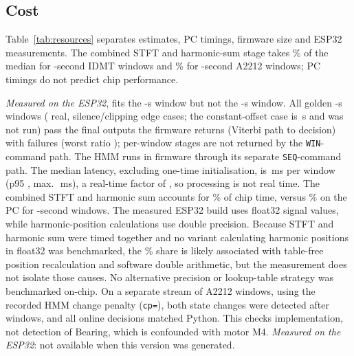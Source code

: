\documentclass[conference]{IEEEtran}
\newif\ifwip
\begin{document}
\begin{table}[t]
\centering
\scriptsize
\caption{Stage checks passed on the PC (\VEqCases{} windows; \VEqSeqCombos{} sequence
configurations). A stage fails if it fails on any window. All
float32 failures are the \VEqFloatBadCases{} synthetic constant-offset edge windows, where the
modulation peak is at the float32 noise floor; the decision is unchanged.}
\label{tab:equiv}

\end{table}

\subsection{Cost}
\label{sec:cost}

\ifwip
\emph{Measured on the PC}, the C float32 reference layout needs \VPcCIdmtMed{} and
\VPcCBldcMed{}\,ms per \VParSegIdmt{}- and \VParSegBldc{}-s window (Python: \VPcPyIdmtMed{} and
\VPcPyBldcMed{}\,ms); none of this transfers to the chip.
\else
Table~\ref{tab:resources} separates estimates, PC timings, firmware size and ESP32 measurements.
The combined STFT and harmonic-sum stage takes \VPcCIdmtTrackPct{}\% of the median for
\VParSegIdmt{}-second IDMT windows and \VPcCBldcTrackPct{}\% for
\VParSegBldc{}-second A2212 windows; PC timings do not predict chip
performance.
\fi

\ifchipmedido
\emph{Measured on the ESP32}, \texttt{\VChipVariant} fits the \VParSegBldc{}-s window but not the
\VParSegIdmt{}-s window. All \VChipEqCases{} golden
\VParSegBldc{}-s windows (\VChipEqCasesReal{} real, \VChipEqCasesEdge{} silence/clipping edge
cases; the constant-offset case is \VParSegIdmt{}\,s and was not run) pass the
\VChipEqStages{} final outputs the firmware returns (Viterbi path to decision) with
\VChipEqFail{} failures (worst ratio \VChipEqMaxRatio{});
\VChipEqStagesAbsent{} per-window stages are not
returned by the \texttt{WIN}-command path. The HMM runs in firmware through its separate
\texttt{SEQ}-command path. The median latency, excluding one-time initialisation, is
\VChipLatBldcMed{}\,ms per window (p95
\VChipLatBldcPninetyfive{}, max.\ \VChipLatBldcMax{}\,ms), a real-time factor of
\VChipRtfBldc{}, so processing is not real time. The combined STFT and harmonic sum accounts for
\VChipBldcTrackPct{}\% of chip time, versus \VPcCBldcTrackPct{}\% on the PC for
\VParSegBldc{}-second windows.
The measured ESP32 build uses float32 signal values, while harmonic-position calculations use
double precision. Because STFT and harmonic sum were timed together and no variant calculating
harmonic positions in float32 was benchmarked, the \VChipBldcTrackPct{}\% share is likely
associated with table-free position recalculation and software double arithmetic, but the
measurement does not isolate those causes. No alternative precision or lookup-table strategy was
benchmarked on-chip. On a separate stream of \VChipSeqWindows{} A2212 windows, using the
recorded HMM change penalty (\texttt{cp=\VChipSeqCp}), both state changes were detected after
\VChipSeqDelay{} windows, and all \VChipSeqSame{} online decisions matched Python. This checks
implementation, not detection of Bearing, which is confounded with motor M4.
\else
\emph{Measured on the ESP32}: not available when this version was generated.
\fi
\end{document}
